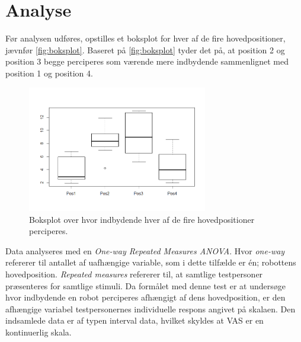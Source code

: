 \section{Analyse}
\label{SkaleringseksperimentAnalyse}
%
Før analysen udføres, opstilles et boksplot for hver af de fire hovedpositioner, jævnfør \autoref{fig:boksplot}. Baseret på \autoref{fig:boksplot} tyder det på, at position 2 og position 3 begge perciperes som værende mere indbydende sammenlignet med position 1 og position 4.   
%
\begin{figure}[H]
\centering
\includegraphics[width = 0.7\textwidth]{Figure/Rplot.png} 
\caption{Boksplot over hvor indbydende hver af de fire hovedpositioner perciperes.}
\label{fig:boksplot}
\end{figure}
\noindent
%
Data analyseres med en \textit{One-way Repeated Measures ANOVA}. Hvor \textit{one-way} refererer til antallet af uafhængige variable, som i dette tilfælde er én; robottens hovedposition. \textit{Repeated measures} refererer til, at samtlige testpersoner præsenteres for samtlige stimuli. Da formålet med denne test er at undersøge hvor indbydende en robot perciperes afhængigt af dens hovedposition, er den afhængige variabel testpersonernes individuelle respons angivet på skalaen. Den indsamlede data er af typen interval data, hvilket skyldes at VAS er en kontinuerlig skala. 

